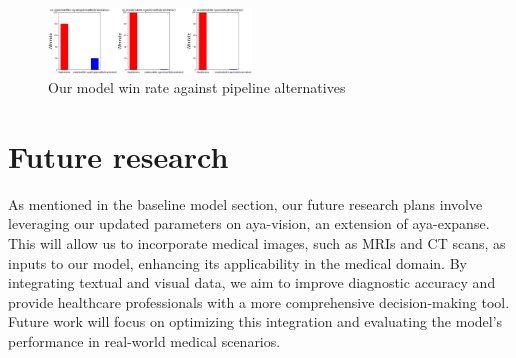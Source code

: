\documentclass[conference]{IEEEtran}
\begin{document}
\begin{figure}[htbp]
	\centerline{\includegraphics[width=0.48\textwidth]{fig5.png}}
	\caption{Our model win rate against pipeline alternatives}
	\label{fig5}
\end{figure}
\section*{Future research}
As mentioned in the baseline model section, our future research plans involve leveraging our updated parameters on aya-vision, an extension of aya-expanse. This will allow us to incorporate medical images, such as MRIs and CT scans, as inputs to our model, enhancing its applicability in the medical domain. By integrating textual and visual data, we aim to improve diagnostic accuracy and provide healthcare professionals with a more comprehensive decision-making tool. Future work will focus on optimizing this integration and evaluating the model’s performance in real-world medical scenarios.
\end{document}

